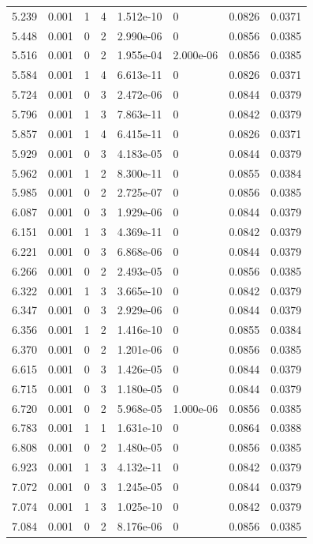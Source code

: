 \documentclass[preview]{standalone}
\begin{document}
{{{\begin{tabular}{L{1.2cm}C{1.2cm} C{0.3cm}C{0.5cm} C{1.4cm}C{1.4cm} C{1.4cm}C{1.4cm}}
  5.239  &  0.001  & 1     &  4 &  1.512e-10  & 0  & 0.0826 &  0.0371   \\ 
  5.448  &  0.001  & 0     &  2 &  2.990e-06  & 0  & 0.0856 &  0.0385   \\ 
  5.516  &  0.001  & 0     &  2 &  1.955e-04  & 2.000e-06  & 0.0856 &  0.0385   \\ 
  5.584  &  0.001  & 1     &  4 &  6.613e-11  & 0  & 0.0826 &  0.0371   \\ 
  5.724  &  0.001  & 0     &  3 &  2.472e-06  & 0  & 0.0844 &  0.0379   \\ 
  5.796  &  0.001  & 1     &  3 &  7.863e-11  & 0  & 0.0842 &  0.0379   \\ 
  5.857  &  0.001  & 1     &  4 &  6.415e-11  & 0  & 0.0826 &  0.0371   \\ 
  5.929  &  0.001  & 0     &  3 &  4.183e-05  & 0  & 0.0844 &  0.0379   \\ 
  5.962  &  0.001  & 1     &  2 &  8.300e-11  & 0  & 0.0855 &  0.0384   \\ 
  5.985  &  0.001  & 0     &  2 &  2.725e-07  & 0  & 0.0856 &  0.0385   \\ 
  6.087  &  0.001  & 0     &  3 &  1.929e-06  & 0  & 0.0844 &  0.0379   \\ 
  6.151  &  0.001  & 1     &  3 &  4.369e-11  & 0  & 0.0842 &  0.0379   \\ 
  6.221  &  0.001  & 0     &  3 &  6.868e-06  & 0  & 0.0844 &  0.0379   \\ 
  6.266  &  0.001  & 0     &  2 &  2.493e-05  & 0  & 0.0856 &  0.0385   \\ 
  6.322  &  0.001  & 1     &  3 &  3.665e-10  & 0  & 0.0842 &  0.0379   \\ 
  6.347  &  0.001  & 0     &  3 &  2.929e-06  & 0  & 0.0844 &  0.0379   \\ 
  6.356  &  0.001  & 1     &  2 &  1.416e-10  & 0  & 0.0855 &  0.0384   \\ 
  6.370  &  0.001  & 0     &  2 &  1.201e-06  & 0  & 0.0856 &  0.0385   \\ 
  6.615  &  0.001  & 0     &  3 &  1.426e-05  & 0  & 0.0844 &  0.0379   \\ 
  6.715  &  0.001  & 0     &  3 &  1.180e-05  & 0  & 0.0844 &  0.0379   \\ 
  6.720  &  0.001  & 0     &  2 &  5.968e-05  & 1.000e-06  & 0.0856 &  0.0385   \\ 
  6.783  &  0.001  & 1     &  1 &  1.631e-10  & 0  & 0.0864 &  0.0388   \\ 
  6.808  &  0.001  & 0     &  2 &  1.480e-05  & 0  & 0.0856 &  0.0385   \\ 
  6.923  &  0.001  & 1     &  3 &  4.132e-11  & 0  & 0.0842 &  0.0379   \\ 
  7.072  &  0.001  & 0     &  3 &  1.245e-05  & 0  & 0.0844 &  0.0379   \\ 
  7.074  &  0.001  & 1     &  3 &  1.025e-10  & 0  & 0.0842 &  0.0379   \\ 
  7.084  &  0.001  & 0     &  2 &  8.176e-06  & 0  & 0.0856 &  0.0385   \\ 
\hline 
\end{tabular} 

}}}
\end{document}
